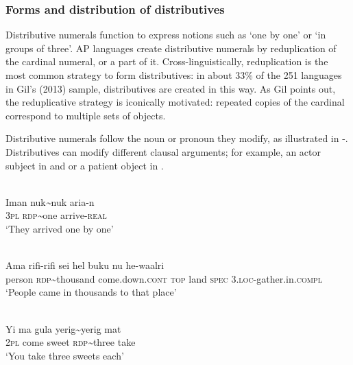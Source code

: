 \subsubsection{Forms and distribution of distributives}
Distributive numerals function to express notions such as `one by one' or `in groups of three'. AP languages create distributive numerals by reduplication of the cardinal numeral, or a part of it. Cross-linguistically, reduplication is the most common strategy to form distributives: in about 33\% of the 251 languages in Gil's (2013) \nocite{Gil2013} sample, distributives are created in this way. As Gil points out, the reduplicative strategy is iconically motivated: repeated copies of the cardinal correspond to multiple sets of objects.

Distributive numerals follow the noun or pronoun they modify, as illustrated in -. Distributives can modify different clausal arguments; for example, an actor subject in  and  or a patient object in .


\ea%
\label{bkm:Ref342655549}
\\
\gll Iman  nuk\textit{\~{}}nuk  aria-n\\  
    \textsc{3pl}   \textsc{rdp}\textit{\~{}}one   arrive-\textsc{real}\\
\glt `They arrived one by one' 
\z

    

   


\ea%
\label{bkm:Ref342738939}
\\
\gll  Ama    rifi-rifi    sei        hel  buku  nu  he-waalri \\  
    person    \textsc{rdp\~{}}thousand   come.down.\textsc{cont}    \textsc{top  } land  \textsc{spec}   3.\textsc{loc-}gather.in.\textsc{compl}  \\
\glt `People came in thousands to that place' 
\z

    
 

   

   

\ea%
\label{bkm:Ref342655553}
\\
\gll Yi   ma   gula   yerig\~{}yerig   mat\\  
     2\textsc{pl } come  sweet  \textsc{rdp}\textit{\~{}}three  take \\
\glt `You take three sweets each'
\z

